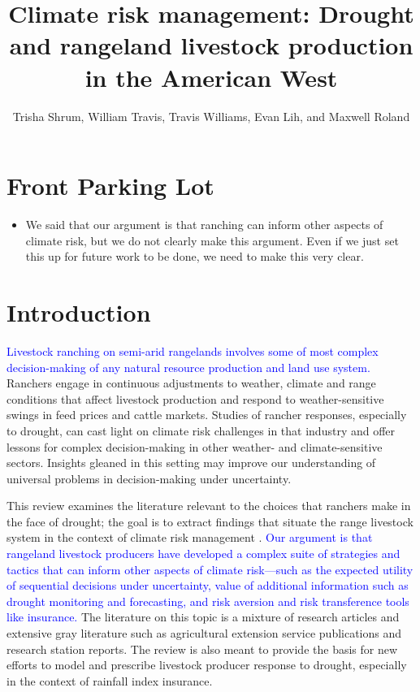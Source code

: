 \documentclass[11pt]{article}
\title{Climate risk management: Drought and rangeland livestock production in the American West
}
\author{Trisha Shrum, William Travis, Travis Williams, Evan Lih, and Maxwell Roland}
\begin{document}
\maketitle

\section{Front Parking Lot}
\begin{itemize}
\item We said that our argument is that ranching can inform other aspects of climate risk, but we do not clearly make this argument. Even if we just set this up for future work to be done, we need to make this very clear.
\end{itemize}


\section{Introduction}
\textcolor{blue}{Livestock ranching on semi-arid rangelands involves some of most complex decision-making of any natural resource production and land use system.} Ranchers engage in continuous adjustments to weather, climate and range conditions that affect livestock production and respond to weather-sensitive swings in feed prices and cattle markets. Studies of rancher responses, especially to drought, can cast light on climate risk challenges in that industry and offer lessons for complex decision-making in other weather- and climate-sensitive sectors. Insights gleaned in this setting may improve our understanding of universal problems in decision-making under uncertainty.  %

This review examines the literature relevant to the choices that ranchers make in the face of drought; the goal is to extract findings that situate the range livestock system in the context of climate risk management \citep{Travis2014}. \textcolor{blue}{Our argument is that rangeland livestock producers have developed a complex suite of strategies and tactics that can inform other aspects of climate risk---such as the expected utility of sequential decisions under uncertainty, value of additional information such as drought monitoring and forecasting, and risk aversion and risk transference tools like insurance.} The literature on this topic is a mixture of research articles and extensive gray literature such as agricultural extension service publications and research station reports. The review is also meant to provide the basis for new efforts to model and prescribe livestock producer response to drought, especially in the context of rainfall index insurance. %
\end{document}
